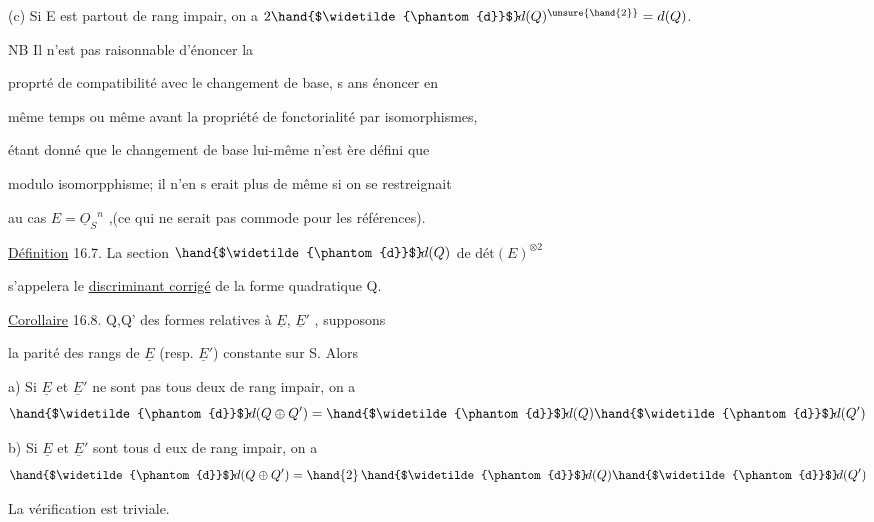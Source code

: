 
(c) Si E est partout de rang impair, on a $2\hand{$\widetilde{\phantom{d}}$}\!d(Q)^{\unsure{\hand{2}}} = d(Q)$.


 \quad NB Il n'est pas raisonnable d'énoncer la

proprté de compatibilité avec le changement de base, s ans énoncer en

même temps\hand{,} ou même avant\hand{,} la propriété de fonctorialité par isomorphismes,

étant donné que le changement de base  lui-même n'est ère défini que

modulo isomorpphisme; il n'en s erait plus de même si on se restreignait

au cas $E = \underline{O}_S{}^n$ ,(ce qui ne serait pas commode pour les références).

 \quad \uline{Définition} 16.7. La section $\hand{$\widetilde{\phantom{d}}$}\!d(Q)$ de $\text{dét}(E)^{\otimes 2}$

s'appelera le \uline{discriminant corrigé} de la forme quadratique Q.

\uline{Corollaire} 16.8.  Q,Q' des formes relatives à $\underline{E}$, $\underline{E}'$ , supposons

la parité des rangs de $\underline{E}$ (resp. $\underline{E}'$) constante sur S. Alors

a) Si $\underline{E}$ et $\underline{E}'$ ne sont pas tous deux de rang impair, on a
\[ \hand{$\widetilde{\phantom{d}}$}\!d(Q \oplus Q') = \hand{$\widetilde{\phantom{d}}$}\!d(Q)\hand{$\widetilde{\phantom{d}}$}\!d(Q') \]

b) Si $\underline{E}$ et $\underline{E}'$ sont tous d eux de rang impair, on a
\[ \hand{$\widetilde{\phantom{d}}$}\!d(Q \oplus Q') = \hand{2}\,\hand{$\widetilde{\phantom{d}}$}\!d(Q)\hand{$\widetilde{\phantom{d}}$}\!d(Q') \]

La vérification est triviale.

